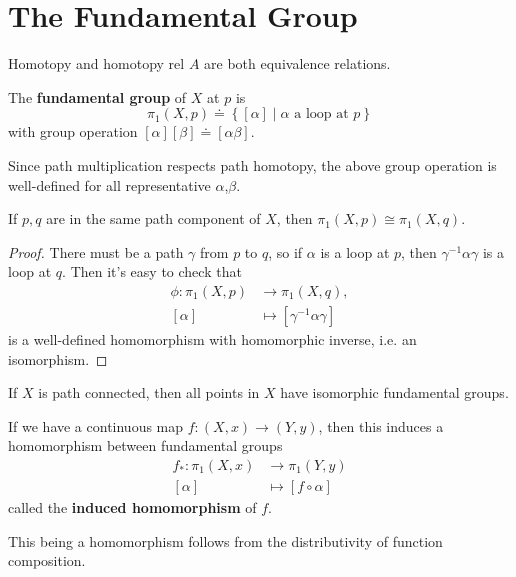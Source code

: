 \documentclass[twoside,10pt]{report}
\begin{document}

\section{The Fundamental Group}

\begin{lem}
Homotopy and homotopy rel $A$ are both equivalence relations.
\end{lem}

\begin{defn}[]
	The \textbf{fundamental group} of $X$ at $p$ is
	\[
		\pi_1(X,p) \doteq \left\{ [\alpha] \;|\; \alpha \text{ a loop at } p \right\}
	\] 
	with group operation
	$
		[\alpha][\beta] \doteq [\alpha \beta].
	$ 
\end{defn}

Since path multiplication respects path homotopy, the above group operation is well-defined for all representative $\alpha$,$\beta$.

\begin{prop}
	If $p,q$ are in the same path component of $X$, then $\pi_1(X,p) \cong \pi_1(X,q)$.
\end{prop}
\begin{proof}
	There must be a path $\gamma$ from $p$ to $q$, so if $\alpha$ is a loop at $p$, then $\gamma^{-1}\alpha\gamma$ is a loop at $q$. Then it's easy to check that
	\begin{align*}
		\phi:\pi_1(X,p)&\to \pi_1(X,q),\\
		[\alpha]&\mapsto [\gamma^{-1}\alpha\gamma]
	\end{align*}
	is a well-defined homomorphism with homomorphic inverse, i.e. an isomorphism.
\end{proof}

\begin{cor}
If $X$ is path connected, then all points in $X$ have isomorphic fundamental groups.
\end{cor}

\begin{defn}[]
If we have a continuous map $f:(X,x)\to (Y,y)$, then this induces a homomorphism between fundamental groups
\begin{align*}
	f_{*}:\pi_1(X,x)&\to \pi_1(Y,y)\\
	[\alpha]&\mapsto [f\circ \alpha]
\end{align*}
called the \textbf{induced homomorphism} of $f$.
\end{defn}
This being a homomorphism follows from the distributivity of function composition.
\end{document}
